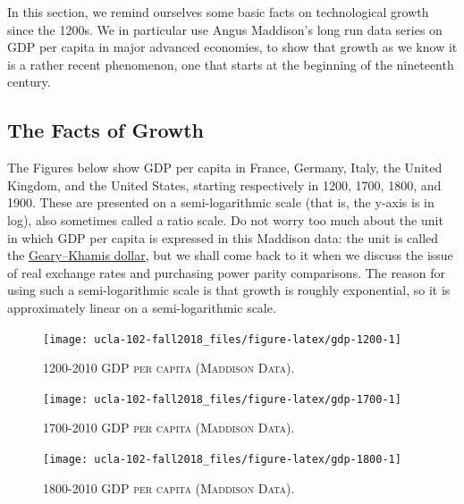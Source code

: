 \documentclass[]{book}
\theoremstyle{definition}
\theoremstyle{definition}
\theoremstyle{definition}
\theoremstyle{remark}
\begin{document}
In this section, we remind ourselves some basic facts on technological
growth since the 1200s. We in particular use Angus Maddison's long run
data series on GDP per capita in major advanced economies, to show that
growth as we know it is a rather recent phenomenon, one that starts at
the beginning of the nineteenth century.

\subsection{The Facts of Growth}\label{the-facts-of-growth}

The Figures below show GDP per capita in France, Germany, Italy, the
United Kingdom, and the United States, starting respectively in 1200,
1700, 1800, and 1900. These are presented on a semi-logarithmic scale
(that is, the y-axis is in log), also sometimes called a ratio scale. Do
not worry too much about the unit in which GDP per capita is expressed
in this Maddison data: the unit is called the
\href{https://en.wikipedia.org/wiki/Geary\%E2\%80\%93Khamis_dollar}{Geary--Khamis
dollar}, but we shall come back to it when we discuss the issue of real
exchange rates and purchasing power parity comparisons. The reason for
using such a semi-logarithmic scale is that growth is roughly
exponential, so it is approximately linear on a semi-logarithmic scale.



\begin{figure}

{\centering \texttt{[image: ucla-102-fall2018\_files/figure-latex/gdp-1200-1]} 

}

\caption{\textsc{1200-2010 GDP per capita (Maddison Data)}.}\label{fig:gdp-1200}
\end{figure}



\begin{figure}

{\centering \texttt{[image: ucla-102-fall2018\_files/figure-latex/gdp-1700-1]} 

}

\caption{\textsc{1700-2010 GDP per capita (Maddison Data)}.}\label{fig:gdp-1700}
\end{figure}



\begin{figure}

{\centering \texttt{[image: ucla-102-fall2018\_files/figure-latex/gdp-1800-1]} 

}

\caption{\textsc{1800-2010 GDP per capita (Maddison Data)}.}\label{fig:gdp-1800}
\end{figure}
\end{document}
